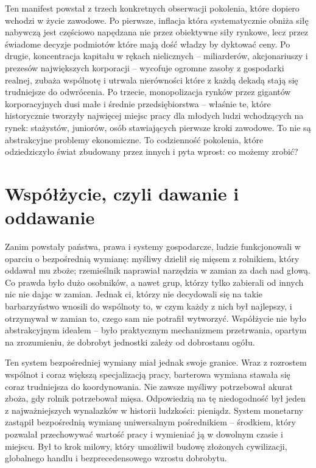 \documentclass[12pt,a4paper]{article}
\begin{document}
Ten manifest powstał z trzech konkretnych obserwacji pokolenia, które dopiero
wchodzi w życie zawodowe. Po pierwsze, inflacja która systematycznie
obniża siłę nabywczą jest częściowo napędzana nie przez obiektywne siły
rynkowe, lecz przez świadome decyzje podmiotów które mają dość władzy by
dyktować ceny. Po drugie, koncentracja kapitału w rękach nielicznych --
miliarderów, akcjonariuszy i prezesów największych korporacji -- wycofuje
ogromne zasoby z gospodarki realnej, zubaża wspólnotę i utrwala nierówności
które z każdą dekadą stają się trudniejsze do odwrócenia. Po trzecie,
monopolizacja rynków przez gigantów korporacyjnych dusi małe i średnie
przedsiębiorstwa -- właśnie te, które historycznie tworzyły najwięcej miejsc
pracy dla młodych ludzi wchodzących na rynek: stażystów, juniorów, osób
stawiających pierwsze kroki zawodowe. To nie są abstrakcyjne problemy
ekonomiczne. To codzienność pokolenia, które odziedziczyło świat zbudowany
przez innych i pyta wprost: co możemy zrobić?

\section*{Współżycie, czyli dawanie i oddawanie}

Zanim powstały państwa, prawa i systemy gospodarcze, ludzie funkcjonowali w oparciu o bezpośrednią wymianę: myśliwy dzielił się mięsem z rolnikiem, który oddawał mu zboże; rzemieślnik naprawiał narzędzia w zamian za dach nad głową. Co prawda było dużo osobników, a nawet grup, którzy tylko zabierali od innych nic nie dając w zamian. Jednak ci, którzy nie decydowali się na takie barbarzyństwo wnosili do wspólnoty to, w czym  każdy z nich był najlepszy, i otrzymywał w zamian to, czego sam nie potrafił wytworzyć. Współżycie nie było abstrakcyjnym ideałem -- było praktycznym mechanizmem przetrwania, opartym na zrozumieniu, że dobrobyt jednostki zależy od dobrostanu ogółu.

Ten system bezpośredniej wymiany miał jednak swoje granice. Wraz z rozrostem wspólnot i coraz większą specjalizacją pracy, barterowa wymiana stawała się coraz trudniejsza do koordynowania. Nie zawsze myśliwy potrzebował akurat zboża, gdy rolnik potrzebował mięsa. Odpowiedzią na tę niedogodność był jeden z najważniejszych wynalazków w historii ludzkości: pieniądz. System monetarny zastąpił bezpośrednią wymianę uniwersalnym pośrednikiem -- środkiem, który pozwalał przechowywać wartość pracy i wymieniać ją w dowolnym czasie i miejscu. Był to krok milowy, który umożliwił budowę złożonych cywilizacji, globalnego handlu i bezprecedensowego wzrostu dobrobytu.
\end{document}
